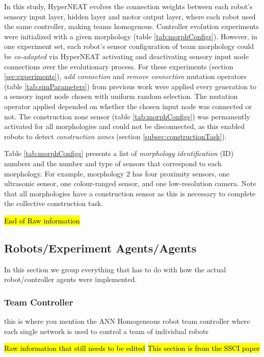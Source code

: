 \documentclass[conference]{IEEEtran}
\begin{document}
In this study, HyperNEAT evolves the connection weights between each robot's sensory input layer,
hidden layer and motor output layer, where each robot used the same controller, making teams
homogenous.
Controller evolution experiments were initialized with a given morphology (table \ref{tab:morphConfigs}).
However, in one experiment set, each robot's sensor configuration of team morphology could be
\textit{co-adapted} via HyperNEAT activating and deactivating sensory input node connections over
the evolutionary process.
For these experiments (section \ref{sec:experiments}), \textit{add connection} and
\textit{remove connection} mutation operators (table \ref{tab:simParameters}) from previous work
\cite{HewlandNitschke2015} were applied every generation to a sensory input node
chosen with uniform random selection.  The mutation operator applied depended on whether the chosen input
node was connected or not.  The construction zone sensor (table \ref{tab:morphConfigs}) was permanently activated
for all morphologies and could not be disconnected, as this enabled robots to detect \textit{construction zones}
(section \ref{subsec:constructionTask}).

Table \ref{tab:morphConfigs} presents a list of \textit{morphology identification} (ID) numbers and the
number and type of sensors that correspond to each morphology.
For example, morphology 2 has four proximity sensors, one ultrasonic sensor, one colour-ranged sensor, and
one low-resolution camera.
Note that all morphologies have a construction sensor as this is necessary to complete the collective construction task.

\hl{End of Raw information}

\subsection{Robots/Experiment Agents/Agents}

In this section we group everything that has to do with how the actual robot/controller agents were implemented. 

\subsubsection{Team Controller}
this is where you mention the ANN 
Homogeneous robot team controller where each single network is used to control a team of individual robots

\hl{Raw information that still needs to be edited}
\hl{This section is from the SSCI paper}
\end{document}
